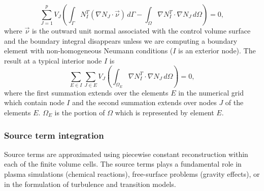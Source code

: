 \begin{equation}
\sum^p_{J=1}  V_J \left( \int_{\Gamma}{N^T_I\left( \nabla N_J\cdot \vec \nu \right)\,d\Gamma}- \int_{\Omega}{ \nabla N^T_I\cdot \nabla N_J\,d\Omega}\right)= 0,
\end{equation}
where $\vec \nu$ is the outward unit normal associated with the control volume surface and the boundary integral disappears unless we are computing a boundary element with non-homogeneous Neumann conditions ($I$ is an exterior node). The result at a typical interior node $I$ is
\begin{equation}
\sum_{E\in I}\sum_{J\in E} V_J\left ( \int_{\Omega_E}{ \nabla N^T_I\cdot \nabla N_J\,d\Omega}\right)=0,
\end{equation}
where the first summation extends over the elements $E$ in the numerical grid which contain node $I$ and the second summation extends over nodes $J$ of the elements $E$. $\Omega_E$ is the portion of $\Omega$ which is represented by element $E$.

\subsubsection{Source term integration}

Source terms are approximated using piecewise constant reconstruction within each of the finite volume cells. The source terms plays a fundamental role in plasma simulations (chemical reactions), free-surface problems (gravity effects), or in the formulation of turbulence and transition models.

